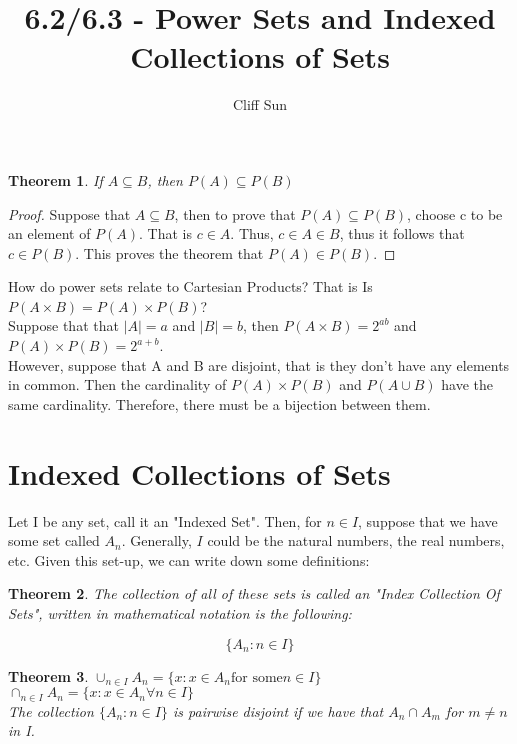\documentclass{article}
\title{6.2/6.3 - Power Sets and Indexed Collections of Sets}
\author{Cliff Sun}
\newtheorem{theorem}{Theorem}[section]
\begin{document}
\maketitle

\begin{theorem}
    If $A \subseteq B$, then $P(A) \subseteq P(B)$
\end{theorem}

\begin{proof}
    Suppose that $A \subseteq B$, then to prove that $P(A) \subseteq P(B)$,
    choose c to be an element of $P(A)$. That is $c \in A$. Thus, $c \in A \in B$, 
    thus it follows that $c \in P(B)$. This proves the theorem that $P(A) \in P(B)$. 
\end{proof}

How do power sets relate to Cartesian Products? That is Is $P(A \times B) = P(A) \times P(B)$? \\

Suppose that that $|A| = a$ and $|B| = b$, then $P(A \times B) = 2^{ab}$ and $P(A) \times P(B) = 2^{a + b}$.\\

However, suppose that A and B are disjoint, that is they don't have any elements in common. Then the cardinality of 
$P(A) \times P(B)$ and $P(A \cup B)$ have the same cardinality. Therefore, there must be a bijection between them. 

\section*{Indexed Collections of Sets}

Let I be any set, call it an "Indexed Set". Then, for $n \in I$, suppose that we have some set called $A_n$. 
Generally, $I$ could be the natural numbers, the real numbers, etc. Given this set-up, we can write down some definitions:

\begin{theorem}
    The collection of all of these sets is called an "Index Collection Of Sets", written in mathematical notation is the following:

    \begin{equation}
        \{A_n: n \in I\}
    \end{equation}
\end{theorem}


\begin{theorem}
    $\cup_{n \in I} A_n = \{x: x \in A_n \textrm{for some} n \in I\}$ \\
    $\cap_{n \in I} A_n = \{x: x \in A_n \forall n \in I\}$ \\
    The collection $\{A_n: n \in I\}$ is pairwise disjoint if we have that $A_n \cap A_m$ for $m \neq n$ in I. 
\end{theorem}
\end{document}
